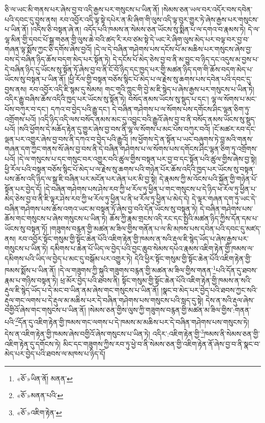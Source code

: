 ཅི་ལ་ཡང་མི་གནས་པར་ཞེས་བྱ་བ་འདི་རྒྱས་པར་གསུངས་པ་ཡིན་ནོ། །སེམས་ཅན་ཡལ་བར་འདོར་བས་དབེན་པའི་དབང་དུ་བྱས་ནས། རབ་འབྱོར་འདི་ལྟ་སྟེ་དཔེར་ན་མི་ཞིག་གི་ལུས་འདི་ལྟ་བུར་གྱུར་ཏེ་ཞེས་རྒྱས་པར་གསུངས་པ་ཡིན་ནོ། །འདིས་ཅི་བསྟན་ཞེ་ན། འདོད་པའི་ཁམས་ན་སེམས་ཅན་ཡོངས་སུ་སྨིན་པ་ལ་དགའ་བ་རྣམས་ཏེ། དེ་ལ་ལྷ་མིན་གྱི་དབང་པོ་སྒྲ་གཅན་གྱི་ལུས་ཆེ་བའི་ཚད་རི་རབ་ཙམ་སྟེ་དེ་ཡང་རེ་ཞིག་ལུས་མེད་པར་བལྟ་བར་བྱ་བ་གཞན་ལྟ་སྨོས་ཀྱང་ཅི་དགོས་ཞེས་བྱའོ། །དེ་ལ་དེ་བཞིན་གཤེགས་པས་དངོས་པོ་མ་མཆིས་པར་གསུངས་ཞེས་བྱ་བས་དེ་བཞིན་ཉིད་ཆོས་བདག་མེད་པར་སྟོན་ཏེ། དེ་དངོས་པོ་མེད་ཅེས་བྱ་བ་ནི་མ་བྱུང་བ་ཉིད་དང་འདུས་མ་བྱས་པ་དེ་བཞིན་ཉིད་དུ་ཡོངས་སུ་སྟོན་ཏོ་ཞེས་བྱ་བ་ནི་ངོ་བོ་ཉིད་དང་ཁྱད་པར་གྱི་མཚན་ཉིད་དག་གི་ཆོས་བདག་མེད་པ་ཡོངས་སུ་བསྟན་པ་ཡིན་ནོ། །ཕྱི་རོལ་གྱི་བསྟན་བཅོས་སྙིང་པོ་མེད་པ་ལ་རྗེས་སུ་ཆགས་པས་དབེན་པའི་དབང་དུ་བྱས་ནས། རབ་འབྱོར་འདི་ཇི་སྙམ་དུ་སེམས། གང་གཱའི་ཀླུང་གི་བྱེ་མ་ཇི་སྙེད་པ་ཞེས་རྒྱས་པར་གསུངས་པ་ཡིན་ཏེ། འདིར་རྒྱུ་བཞིས་ཆོས་འདིའི་ཁྱད་པར་ཡོངས་སུ་སྟོན་ཏེ། བསོད་ནམས་ཡོངས་སུ་སྡུད་པ་དང་། ལྷ་ལ་སོགས་པ་མང་པོས་བཀུར་བ་དང་། དཀའ་བ་བྱེད་པའི་རྒྱུ་དང་། དེ་བཞིན་གཤེགས་པ་ལ་སོགས་པས་དགོངས་ཤིང་ལྷན་ཅིག་ཏུ་འགྲོགས་པའོ། །འདི་ཉིད་འདི་ལས་བསོད་ནམས་མང་དུ་འབྱུང་བའི་རྒྱུའོ་ཞེས་བྱ་བ་ནི་བསོད་ནམས་ཡོངས་སུ་སྡུད་པའོ། །སའི་ཕྱོགས་དེ་མཆོད་རྟེན་དུ་གྱུར་ཞེས་བྱ་བས་ནི་ལྷ་ལ་སོགས་པ་མང་པོས་བཀུར་བའོ། །ངོ་མཚར་རབ་དང་ལྡན་པར་འགྱུར་ཞེས་བྱ་བས་ནི་དཀའ་བ་བྱེད་པའི་རྒྱུའོ། །ས་ཕྱོགས་དེ་ན་སྟོན་པ་ཡང་བཞུགས་ཏེ་བླ་མའི་གནས་གཞན་དག་ཀྱང་གནས་སོ་ཞེས་བྱ་བས་ནི་དེ་བཞིན་གཤེགས་པ་ལ་སོགས་པས་དགོངས་ཤིང་ལྷན་ཅིག་ཏུ་འགྲོགས་པའོ། །དེ་ལ་གསུངས་པ་དང་གསུང་བར་འགྱུར་བའི་ཚུལ་གྱིས་བསྟན་པར་བྱ་བ་དང་སྟོན་པའི་ཚུལ་གྱིས་ཞེས་བྱ་སྟེ། ཕྱི་རོལ་པའི་བསྟན་བཅོས་སྙིང་པོ་མེད་པ་ལ་རྗེས་སུ་ཆགས་པའི་གཉེན་པོར་ཆོས་འདིའི་ཁྱད་པར་ཡོངས་སུ་བསྟན་པས་ཆོས་འདི་ཉིད་ལ་སྒྲ་ཇི་བཞིན་པར་མངོན་པར་ཞེན་པར་མི་བྱ་སྟེ། དེ་རྣམས་ཀྱི་མ་འོངས་པའི་སྐྱོན་གྱི་གཉེན་པོ་སྟོན་པར་བྱེད་དོ། །དེ་བཞིན་གཤེགས་པས་ཤེས་རབ་ཀྱི་ཕ་རོལ་ཏུ་ཕྱིན་པ་གང་གསུངས་པ་དེ་ཉིད་ཕ་རོལ་ཏུ་ཕྱིན་པ་མེད་ཅེས་བྱ་བ་ནི་ཇི་ལྟར་ཤེས་རབ་ཀྱི་ཕ་རོལ་ཏུ་ཕྱིན་པ་ནི་ཕ་རོལ་ཏུ་ཕྱིན་པ་མེད་དེ། དེ་ལྟར་གཞན་དག་ཏུ་ཡང་དེ་བཞིན་གཤེགས་པས་ཆོས་འགའ་ཡང་མ་བསྟན་ཏོ་ཞེས་བྱ་བའི་དོན་ཡོངས་སུ་བསྟན་ཏེ། དེ་བཞིན་གཤེགས་པས་ཆོས་གང་གསུངས་པ་ཞེས་གསུངས་པ་ཡིན་ཏེ། ཆོས་ཀྱི་རྣམ་གྲངས་འདི་རང་དང་སྤྱིའི་མཚན་ཉིད་ཀྱིས་དོན་དམ་པ་ཡོངས་སུ་བསྟན་ཏོ། །གཟུགས་བརྙན་གྱི་མཚན་མ་ཟིལ་གྱིས་གནོན་པ་ལ་མི་མཁས་པས་དབེན་པའི་དབང་དུ་མཛད་ནས། རབ་འབྱོར་སྟོང་གསུམ་གྱི་སྟོང་ཆེན་པོའི་འཇིག་རྟེན་གྱི་ཁམས་ན་སའི་རྡུལ་ཇི་སྙེད་ཡོད་པ་ཞེས་རྒྱས་པར་གསུངས་པ་ཡིན་ཏེ། དམིགས་པ་ཆེན་པོ་ཡིད་ལ་བྱེད་པའི་བྱང་ཆུབ་སེམས་དཔའ་རྣམས་འཇིག་རྟེན་གྱི་ཁམས་ལ་དམིགས་པའི་ཡིད་ལ་བྱེད་པ་མང་དུ་བསྒོམ་པར་འགྱུར་ཏེ། དེའི་ཕྱིར་སྟོང་གསུམ་གྱི་སྟོང་ཆེན་པོའི་འཇིག་རྟེན་གྱི་ཁམས་སྨོས་པ་ཡིན་ནོ། །དེ་ལ་གཟུགས་ཀྱི་སྐུའི་གཟུགས་བརྙན་གྱི་མཚན་མ་ཟིལ་གྱིས་གནན་\footnote{«ཅོ་»ཡིན་ནོ། མནན་}པའི་དོན་དུ་ཐབས་རྣམ་པ་གཉིས་བསྟན་ཏེ། ཕྲ་མོར་བྱེད་པའི་ཐབས་ནི། སྟོང་གསུམ་གྱི་སྟོང་ཆེན་པོའི་འཇིག་རྟེན་གྱི་ཁམས་ན་སའི་རྡུལ་ཇི་སྙེད་ཡོད་པ་དེ་མང་བ་ཡིན་ནམ་ཞེས་གང་གསུངས་པ་ཡིན་ནོ། །སྣང་བ་མེད་པར་བྱེད་པའི་ཐབས་ཀྱང་སའི་རྡུལ་གང་ལགས་པ་དེ་རྡུལ་མ་མཆིས་པར་དེ་བཞིན་གཤེགས་པས་གསུངས་པའི་སླད་དུ་སྟེ། དེས་ན་སའི་རྡུལ་ཞེས་བགྱིའོ་ཞེས་གང་གསུངས་པ་ཡིན་ནོ། །སེམས་ཅན་གྱིས་ལུས་ཀྱི་གཟུགས་བརྙན་གྱི་མཚན་མ་ཟིལ་གྱིས་:གནན་པའི་\footnote{«ཅོ་»མནན་པའི་}དོན་དུ་འཇིག་རྟེན་གྱི་ཁམས་གང་ལགས་པ་དེ་ཁམས་མ་མཆིས་པར་དེ་བཞིན་གཤེགས་པས་གསུངས་ཏེ། དེས་ན་འཇིག་རྟེན་གྱི་ཁམས་ཞེས་བགྱིའོ་ཞེས་གསུངས་པ་ཡིན་ཏེ། འདིར་:འཇིག་རྟེན་གྱི་\footnote{«ཅོ་»འཇིག་རྟེན་}ཁམས་ནི་སེམས་ཅན་གྱི་འཇིག་རྟེན་དུ་དགོངས་ཏེ། མིང་དང་གཟུགས་ཀྱིས་རབ་ཏུ་ཕྱེ་བ་ནི་སེམས་ཅན་གྱི་འཇིག་རྟེན་ནོ་ཞེས་བྱ་བ་ནི་སྣང་བ་མེད་པར་བྱེད་པའི་ཐབས་ལ་མཁས་པ་ཉིད་དོ། 